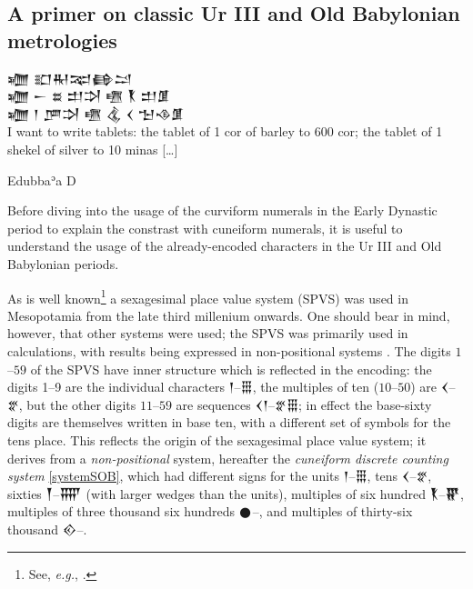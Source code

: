 \documentclass[10pt, a4paper, twoside]{article}
\newcommand{\exempligratia}{\emph{e.g.}}
\renewcommand{\epigraphsize}{\footnotesize}
\begin{document}
\subsection{A primer on classic Ur III and Old Babylonian metrologies}
\label{metrology}
{\settowidth{\epigraphwidth}{\epigraphsize\obfont 𒁾 𒁹 𒂆𒋫 𒍠 𒆬 𒌋 𒈠𒈾𒂠 \hspace{1.5em}}
\epigraph{
{\obfont 𒁾 𒊬𒊑𒉈\hfill 𒂵𒁺} \\
{\obfont 𒁾 𒀸 𒊺 𒄥𒋫 𒍠 \hfill {\nafont 𒐞} 𒄥𒂠} \\
{\obfont 𒁾 𒁹 𒂆𒋫 𒍠 \hfill 𒆬 \hfill 𒌋 𒈠𒈾𒂠} \\
I want to write tablets: the tablet of 1 cor of barley to
600 cor; the tablet of 1 shekel of silver to 10 minas […]}{Edubbaʾa D}}

Before diving into the usage of the curviform numerals
in the Early Dynastic period to explain the constrast
with cuneiform numerals, it is useful to understand
the usage of the already-encoded characters in the
Ur III and Old Babylonian periods.

As is well known\footnote{See, \exempligratia, \cite[§22.3.3,
\emph{sub} ``\href{https://www.unicode.org/versions/Unicode16.0.0/core-spec/chapter-22/\#G42894}{Cuneiform Numerals}'']{Unicode16}.}
a sexagesimal place value system (SPVS) was used in Meso\-potamia from the late third millenium onwards.
One should bear in mind, however, that other systems were used;
the SPVS was primarily used in calculations,
with results being expressed in non-positional systems \cites[76]{Robson2008}{Robson2022}.
The digits $1$–$59$ of the SPVS have inner structure which is reflected in the encoding: the digits 1–9 are the individual
characters {\xsuxfont 𒁹}–{\xsuxfont 𒑆}, the multiples of ten ($10$–$50$) are {\xsuxfont 𒌋}–{\xsuxfont 𒐐},
but the other digits $11$–$59$ are sequences {\xsuxfont 𒌋𒁹}–{\xsuxfont 𒐐𒑆};
in effect the base-sixty digits are themselves written in base ten, with a different set of symbols for the tens place.
This reflects the origin of the sexagesimal place value system;
it derives from a \emph{non-positional} system, hereafter the \emph{cuneiform discrete counting system} \ref{systemSOB},
which had different signs for the units {\xsuxfont 𒁹}–{\xsuxfont 𒑆},
tens {\xsuxfont 𒌋}–{\xsuxfont 𒐐}, sixties {\xsuxfont 𒐕}–{\xsuxfont 𒐝} (with larger wedges
than the units), multiples of six hundred {\xsuxfont 𒐞}–{\xsuxfont 𒐢},
multiples of three thousand six hundreds {\xsuxfont 𒊹}–, and
multiples of thirty-six thousand {\xsuxfont 𒐬}–.
\end{document}
